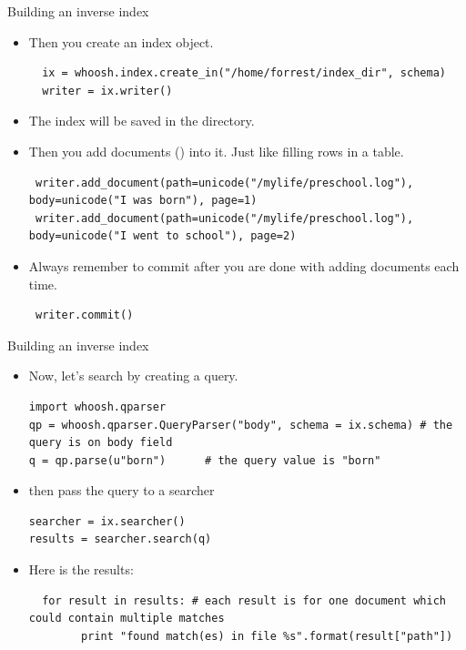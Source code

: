\documentclass[11pt, handout]{beamer}
\begin{document}
\begin{frame}[fragile]{Building an inverse index}
\begin{itemize}[<+->]
 \item Then you create an index object.  
 {\scriptsize
 \begin{lstlisting}
  ix = whoosh.index.create_in("/home/forrest/index_dir", schema) 
  writer = ix.writer()
 \end{lstlisting}
}
 \item The index will be saved in the directory. 
 \item Then you add documents ({\color{red}{not necessarily a real file but a piece of text}}) into it. Just like filling rows in a table. 
 
 {\scriptsize
 \begin{lstlisting}
 writer.add_document(path=unicode("/mylife/preschool.log"), body=unicode("I was born"), page=1)
 writer.add_document(path=unicode("/mylife/preschool.log"), body=unicode("I went to school"), page=2)
 \end{lstlisting}
}
 \item Always remember to commit after you are done with adding documents each time. 
 {\scriptsize
 \begin{lstlisting}
 writer.commit() 
 \end{lstlisting}
}
\end{itemize}
\end{frame}

\begin{frame}[fragile]{Building an inverse index}
\begin{itemize}[<+->]
 \item Now, let's search by creating a query. 
 {\scriptsize
 \begin{lstlisting}
import whoosh.qparser
qp = whoosh.qparser.QueryParser("body", schema = ix.schema) # the query is on body field
q = qp.parse(u"born")      # the query value is "born"
 \end{lstlisting}
}
 \item then pass the query to a searcher
 {\scriptsize
 \begin{lstlisting}
searcher = ix.searcher()
results = searcher.search(q)
 \end{lstlisting}
}
 \item Here is the results:
 {\scriptsize
 \begin{lstlisting}
  for result in results: # each result is for one document which could contain multiple matches 
        print "found match(es) in file %s".format(result["path"])
 \end{lstlisting}
}

\end{itemize}
\end{frame}
\end{document}
